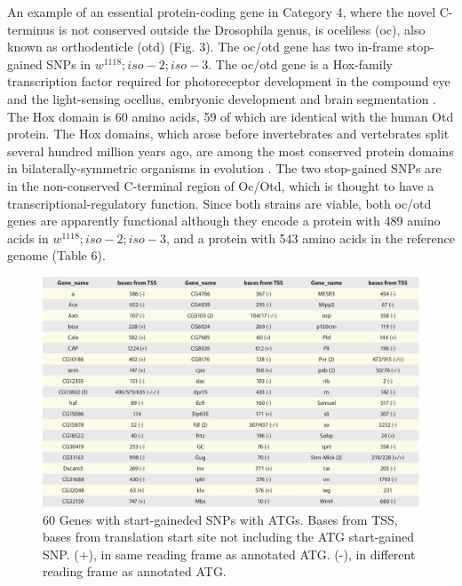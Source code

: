 An example of an essential protein-coding gene in Category 4, where the novel C-terminus is not conserved outside the Drosophila genus, is oceliless (oc), also known as orthodenticle (otd) (Fig. 3). The oc/otd gene has two in-frame stop-gained SNPs in $w^{1118} ; iso-2; iso-3$. The oc/otd gene is a Hox-family transcription factor required for photoreceptor development in the compound eye and the light-sensing ocellus, embryonic development and brain segmentation \cite{acampora1998murine,younossi1997control}. The Hox domain is 60 amino acids, 59 of which are identical with the human Otd protein. The Hox domains, which arose before invertebrates and vertebrates split several hundred million years ago, are among the most conserved protein domains in bilaterally-symmetric organisms in evolution \cite{jones1998gabab}. The two stop-gained SNPs are in the non-conserved C-terminal region of Oc/Otd, which is thought to have a transcriptional-regulatory function. Since both strains are viable, both oc/otd genes are apparently functional although they encode a protein with 489 amino acids in $w^{1118} ; iso-2; iso-3$, and a protein with 543 amino acids in the reference genome (Table 6).

\begin{figure}
    \centering
    \includegraphics[width=14cm]{snpeff_table5.png}
    \caption{60 Genes with start-gaineded SNPs with ATGs. Bases from TSS, bases from translation start site not including the ATG start-gained SNP. (+), in same reading frame as annotated ATG. (-), in different reading frame as annotated ATG.}
    \label{fig:snpeffTab3}
\end{figure}

